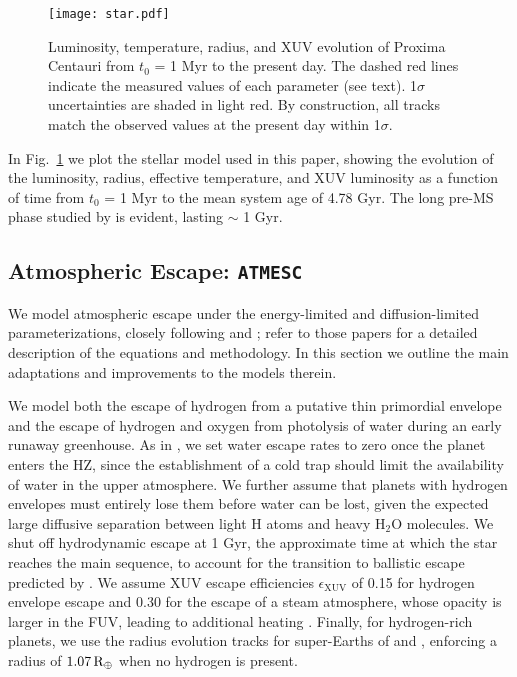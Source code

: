 \documentclass[preprint,12pt]{aastex}
\def\rearth{{\rm\,R_\oplus}}
\def\atmesc{\texttt{\footnotesize{ATMESC}}\xspace}
\begin{document}
\begin{figure}[ht]
\centering
\texttt{[image: star.pdf]}
\caption{Luminosity, temperature, radius, and XUV evolution of Proxima
  Centauri from $t_0$ = 1 Myr to the present day. The dashed red lines
  indicate the measured values of each parameter (see text). 1$\sigma$
  uncertainties are shaded in light red. By construction, all tracks
  match the observed values at the present day within 1$\sigma$.}
\label{fig:stellar:evol}
\end{figure}

In Fig.~\ref{fig:stellar:evol} we plot the stellar model used in this
paper, showing the evolution of the luminosity, radius, effective
temperature, and XUV luminosity as a function of time from $t_0$ = 1
Myr to the mean system age of 4.78 Gyr. The long pre-MS phase studied
by \cite{LugerBarnes15} is evident, lasting $\sim$ 1 Gyr.

\subsection{Atmospheric Escape: \atmesc}
\label{sec:models:atmesc}

We model atmospheric escape under the energy-limited \citep{Watson81,Erkaev07} and
diffusion-limited \citep{Hunten73} parameterizations, closely following \cite{Luger15}
and \cite{LugerBarnes15}; refer to those papers for a detailed
description of the equations and methodology. In this section we
outline the main adaptations and improvements to the models therein.

We model both the escape of hydrogen from a putative thin primordial
envelope and the escape of hydrogen and oxygen from photolysis of
water during an early runaway greenhouse. As in \cite{LugerBarnes15},
we set water escape rates to zero once the planet enters the HZ, since
the establishment of a cold trap should limit the availability of
water in the upper atmosphere. We further assume that planets with
hydrogen envelopes must entirely lose them before water can be lost,
given the expected large diffusive separation between light H atoms
and heavy H$_2$O molecules.  We shut off hydrodynamic escape at 1 Gyr,
the approximate time at which the star reaches the main sequence, to
account for the transition to ballistic escape predicted by
\cite{OwenMohanty16}. We assume XUV escape efficiencies
$\epsilon_\mathrm{XUV}$ of 0.15 for hydrogen envelope escape and 0.30
for the escape of a steam atmosphere, whose opacity is larger in the
FUV, leading to additional heating \citep{Sekiya81}. Finally, for
hydrogen-rich planets, we use the radius evolution tracks for
super-Earths of \cite{Lopez12} and \cite{LopezFortney14}, enforcing a
radius of $1.07 \rearth$ when no hydrogen is present.
\end{document}
